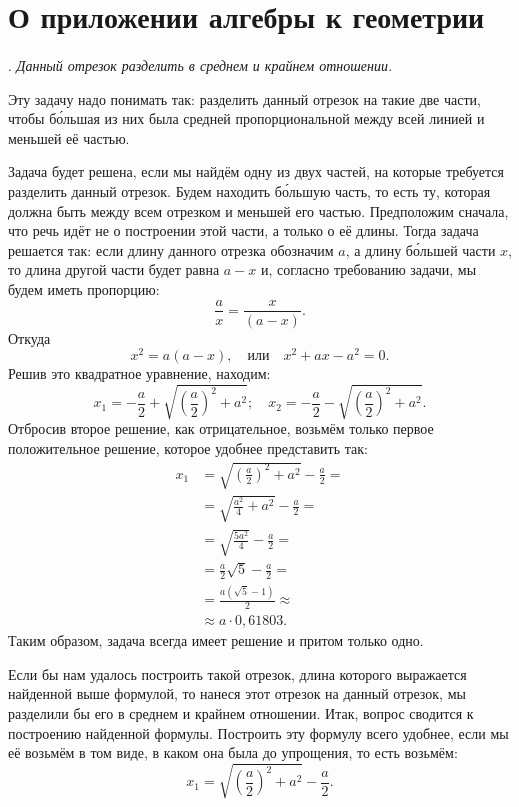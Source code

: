 {\small

\section{О приложении алгебры к геометрии}

\paragraph{}\label{1938/209}
.
\emph{Данный отрезок разделить в среднем и крайнем отношении.}

Эту задачу надо понимать так:
разделить данный отрезок на такие две части, чтобы б\'{о}льшая из них была средней пропорциональной между всей линией и меньшей её частью.

Задача будет решена, если мы найдём одну из двух частей, на которые требуется разделить данный отрезок.
Будем находить б\'{о}льшую часть, то есть ту, которая должна быть  между всем отрезком и меньшей его частью.
Предположим сначала, что речь идёт не о построении этой части, а только о  её длины.
Тогда задача решается  так:
если длину данного отрезка обозначим $a$, а длину б\'{о}льшей части $x$, то длина другой части будет равна $a-x$ и, согласно требованию задачи, мы будем иметь пропорцию:
\[\frac ax=\frac x{(a-x)}.\]
Откуда
\[x^2=a(a-x),
\quad\text{или}\quad
x^2+ax-a^2=0.\]
Решив это квадратное уравнение, находим:
\[
x_1=-\frac a2 + \sqrt{\left(\frac a2\right)^2+a^2};
\quad
x_2=-\frac a2 - \sqrt{\left(\frac a2\right)^2+a^2}.
\]
Отбросив второе решение, как отрицательное, возьмём только первое положительное решение, которое удобнее представить так:
\begin{align*}
x_1&= \sqrt{\left(\frac a2\right)^2+a^2}-\frac a2 =
\\
&= \sqrt{\frac {a^2}4+a^2}-\frac a2 =
\\
&= \sqrt{\frac {5a^2}4}-\frac a2 =
\\
&= \frac a2\sqrt{5}-\frac a2 =
\\
&= \frac {a(\sqrt{5}-1)}2 \approx
\\
&\approx a\cdot 0{,}61803.
\end{align*}
Таким образом, задача всегда имеет решение и притом только одно.

Если бы нам удалось построить такой отрезок, длина которого выражается найденной выше формулой, то нанеся этот отрезок на данный отрезок, мы разделили бы его в среднем и крайнем отношении.
Итак, вопрос сводится к построению найденной формулы.
Построить эту формулу всего удобнее, если мы её возьмём в том виде, в каком она была до упрощения, то есть возьмём:
\[x_1= \sqrt{\left(\frac a2\right)^2+a^2}-\frac a2.\]

}
